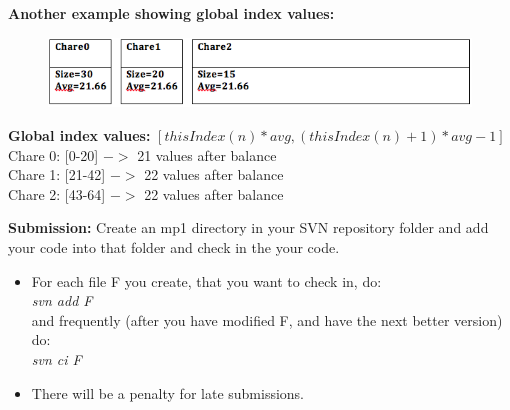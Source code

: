 \documentclass{article}
\begin{document}
\textbf{Another example showing global index values:}

\begin{figure}[h]
\centering
\includegraphics[width=\textwidth]{example.png}
\label{prefix}
\end{figure}
\textbf{Global index values:} $[thisIndex(n)*avg, (thisIndex(n)+1)*avg-1]$\\
Chare 0: [0-20] $->$ 21 values after balance\\
Chare 1: [21-42] $->$ 22 values after balance\\
Chare 2: [43-64] $->$ 22 values after balance\\


\pagebreak


\textbf{Submission:}
Create an mp1 directory in your SVN repository folder and add your code into
that folder and check in the your code.
\begin{itemize}
\item  For each file F you create, that you want to check in, do: \\
        \textit{svn add F}\\
        and frequently (after you have modified F, and have the next better
        version) do:\\ 
        \textit{svn ci F}
\item  There will be a penalty for late submissions.
\end{itemize}
\end{document}
